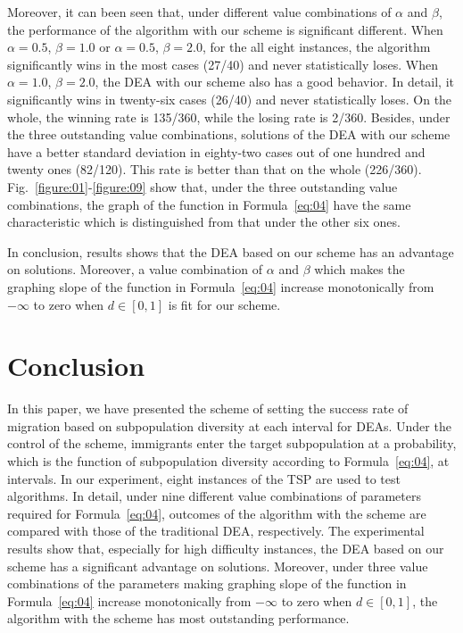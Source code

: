 \documentclass[journal,onecolumn]{IEEEtran}
\begin{document}
Moreover, it can been seen that, under different value combinations of $\alpha$ and $\beta$, the performance of the algorithm with our scheme is significant different.
When $\alpha=0.5$, $\beta=1.0$ or $\alpha=0.5$, $\beta=2.0$, for the all eight instances, the algorithm significantly wins in the most cases (27/40) and never statistically loses.
When $\alpha=1.0$, $\beta=2.0$, the DEA with our scheme also has a good behavior.
In detail, it significantly wins in twenty-six cases (26/40) and never statistically loses.
On the whole, the winning rate is 135/360, while the losing rate is 2/360.
Besides, under the three outstanding value combinations, solutions of the DEA with our scheme have a better standard deviation in eighty-two cases out of one hundred and twenty ones (82/120).
This rate is better than that on the whole (226/360).
Fig.~\ref{figure:01}-\ref{figure:09} show that, under the three outstanding value combinations, the graph of the function in Formula~\ref{eq:04} have the same characteristic which is distinguished from that under the other six ones.

In conclusion, results shows that the DEA based on our scheme has an advantage on solutions.
Moreover, a value combination of $\alpha$ and $\beta$ which makes the graphing slope of the function in Formula~\ref{eq:04} increase monotonically from $-\infty$ to zero when $d\in [0,1]$ is fit for our scheme.

\section{Conclusion}
In this paper, we have presented the scheme of setting the success rate of migration based on subpopulation diversity at each interval for DEAs.
Under the control of the scheme, immigrants enter the target subpopulation at a probability, which is the function of subpopulation diversity according to Formula~\ref{eq:04}, at intervals.
In our experiment, eight instances of the TSP are used to test algorithms.
In detail, under nine different value combinations of parameters required for Formula~\ref{eq:04}, outcomes of the algorithm with the scheme are compared with those of the traditional DEA, respectively.
The experimental results show that, especially for high difficulty instances, the DEA based on our scheme has a significant advantage on solutions.
Moreover, under three value combinations of the parameters making graphing slope of the function in Formula~\ref{eq:04} increase monotonically from $-\infty$ to zero when $d\in [0,1]$, the algorithm with the scheme has most outstanding performance.
\end{document}
